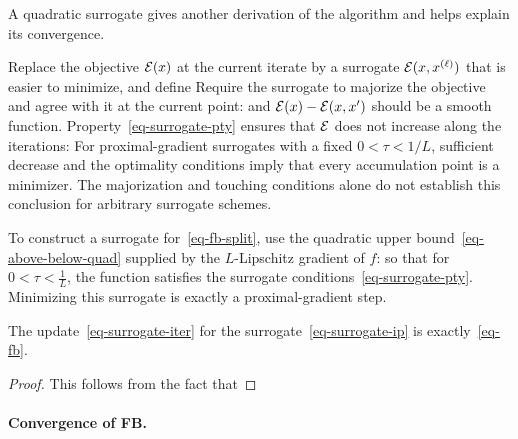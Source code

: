 A quadratic surrogate gives another derivation of the algorithm and helps explain its convergence.

%

Replace the objective $\mathcal{E}(x)$ at the current iterate by a surrogate $\mathcal{E}(x,x^{(\ell)})$ that is easier to minimize, and define
Require the surrogate to majorize the objective and agree with it at the current point:
and $\mathcal{E}(x)-\mathcal{E}(x,x')$ should be a smooth function.
%
Property~\eqref{eq-surrogate-pty} ensures that $\mathcal{E}$ does not increase along the iterations:
For proximal-gradient surrogates with a fixed $0<\tau<1/L$, sufficient decrease and the optimality conditions imply that every accumulation point is a minimizer. The majorization and touching conditions alone do not establish this conclusion for arbitrary surrogate schemes.

To construct a surrogate for~\eqref{eq-fb-split}, use the quadratic upper bound~\eqref{eq-above-below-quad} supplied by the $L$-Lipschitz gradient of $f$:
so that for $0 < \tau < \frac{1}{L}$, the function 
satisfies the surrogate conditions~\eqref{eq-surrogate-pty}.
%
Minimizing this surrogate is exactly a proximal-gradient step.

\begin{prop}
	The update~\eqref{eq-surrogate-iter} for the surrogate~\eqref{eq-surrogate-ip} is exactly~\eqref{eq-fb}.
\end{prop}
\begin{proof}
	This follows from the fact that
\end{proof}

\paragraph{Convergence of FB. }

